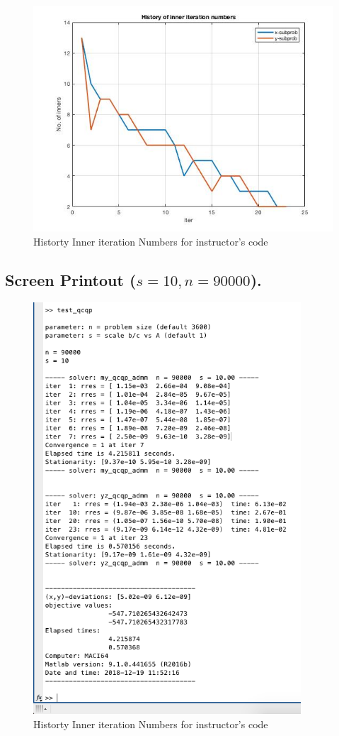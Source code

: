 \begin{figure}[H]
\centering
\includegraphics[width=12cm]{F_10/F_1_4.jpg}
\caption{Historty Inner iteration Numbers for instructor's code}
\end{figure}
\subsection{Screen Printout ($s=10,n=90000$).}
\begin{figure}[H]
\centering
\includegraphics[width=10cm]{F_10/F_1_1.png}
\caption{Historty Inner iteration Numbers for instructor's code}
\end{figure}


